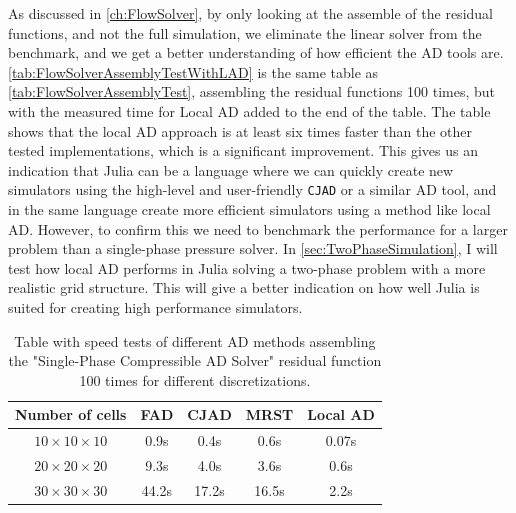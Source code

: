 As discussed in \autoref{ch:FlowSolver}, by only looking at the assemble of the residual functions, and not the full simulation, we eliminate the linear solver from the benchmark, and we get a better understanding of how efficient the AD tools are. \autoref{tab:FlowSolverAssemblyTestWithLAD} is the same table as \autoref{tab:FlowSolverAssemblyTest}, assembling the residual functions 100 times, but with the measured time for Local AD added to the end of the table. The table shows that the local AD approach is at least six times faster than the other tested implementations, which is a significant improvement. This gives us an indication that Julia can be a language where we can quickly create new simulators using the high-level and user-friendly \texttt{CJAD} or a similar AD tool, and in the same language create more efficient simulators using a method like local AD. However, to confirm this we need to benchmark the performance for a larger problem than a single-phase pressure solver. In \autoref{sec:TwoPhaseSimulation}, I will test how local AD performs in Julia solving a two-phase problem with a more realistic grid structure. This will give a better indication on how well Julia is suited for creating high performance simulators.
\begin{table}[htb]
    \centering
    \caption{Table with speed tests of different AD methods assembling the "Single-Phase Compressible AD Solver" residual function 100 times for different discretizations.}
    \label{tab:FlowSolverAssemblyTestWithLAD}
    \def\arraystretch{1.5}
    \begin{tabular}{ccccc}
    \textbf{Number of cells} & \textbf{FAD} & \textbf{CJAD} & \textbf{MRST} & \textbf{Local AD}\\
        \hline
         $10\times10\times10$ & 0.9s & 0.4s & 0.6s & 0.07s \\  
         $20\times20\times20$ & 9.3s & 4.0s & 3.6s & 0.6s \\ 
         $30\times30\times30$ & 44.2s& 17.2s& 16.5s & 2.2s \\ \hline
    \end{tabular}
\end{table}

